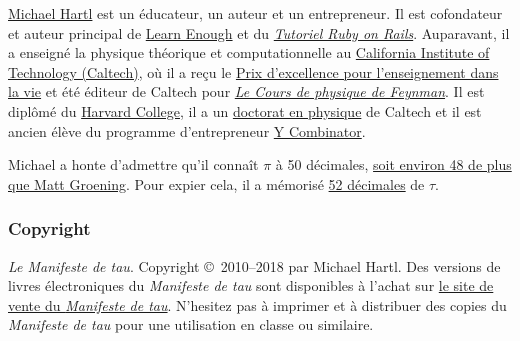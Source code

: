 
\href{https://translate.google.com/translate?hl=en&sl=en&tl=fr&u=https://www.michaelhartl.com/}{Michael
Hartl} est un éducateur, un auteur
et un entrepreneur. Il est cofondateur et auteur principal de
\href{https://www.learnenough.com/}{Learn Enough} et du
\href{https://www.railstutorial.org/}{\emph{Tutoriel Ruby on Rails}}.
Auparavant, il a enseigné la physique théorique et computationnelle au
\href{https://www.caltech.edu/}{California Institute of Technology (Caltech)},
où il a reçu le
\href{https://translate.google.com/translate?hl=en&sl=en&tl=fr&u=https://www.michaelhartl.com/ascit/awards2000.html}{Prix
d'excellence pour l'enseignement dans la vie} et été éditeur de Caltech pour
\href{https://translate.google.com/translate?hl=en&sl=en&tl=fr&u=https://www.feynmanlectures.caltech.edu/}{\emph{Le
Cours de physique de
Feynman}}. Il est diplômé du \href{https://college.harvard.edu/}{Harvard
College}, il a un \href{https://translate.google.com/translate?hl=en&sl=en&tl=fr&u=https://thesis.library.caltech.edu/1940/}{doctorat
en
physique} de Caltech et il est ancien élève du programme d'entrepreneur
\href{https://ycombinator.com/}{Y Combinator}.

Michael a honte d'admettre qu'il connaît $\pi$ à 50 décimales,
\href{\#fig-futurama_video}{soit environ 48 de plus que Matt Groening}. Pour
expier cela, il a mémorisé
\href{https://www.wolframalpha.com/input/?i=N[2+Pi,+53]}{52 décimales} de
$\tau$.

    \subsubsection{Copyright} %
    \label{sec:copyright_and_license}

    \emph{Le Manifeste de tau}. Copyright \copyright\ 2010--2018 par Michael
	Hartl. Des versions de livres électroniques du \emph{Manifeste de tau} sont
	disponibles à l'achat sur \href{https://sales.tauday.com/}{le site de vente
  du \emph{Manifeste de tau}}.
	N'hesitez pas à imprimer et à distribuer des copies du \emph{Manifeste de
	tau} pour une utilisation en classe ou similaire.

